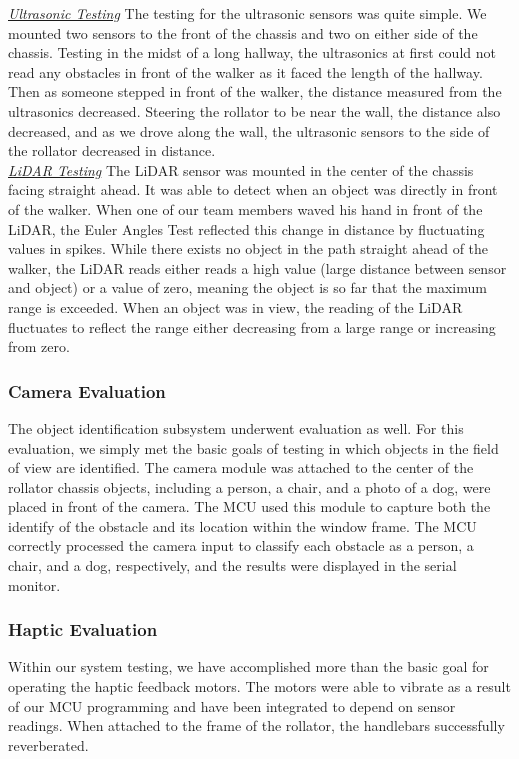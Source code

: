 \noindent \underline{\textit{Ultrasonic Testing}}
\noindent The testing for the ultrasonic sensors was quite simple. We mounted two sensors to the front of the chassis and two on either side of the chassis. Testing in the midst of a long hallway, the ultrasonics at first could not read any obstacles in front of the walker as it faced the length of the hallway. Then as someone stepped in front of the walker, the distance measured from the ultrasonics decreased. Steering the rollator to be near the wall, the distance also decreased, and as we drove along the wall, the ultrasonic sensors to the side of the rollator decreased in distance.\\

\noindent \underline{\textit{LiDAR Testing}} \noindent The LiDAR sensor was mounted in the center of the chassis facing straight ahead. It was able to detect when an object was directly in front of the walker. When one of our team members waved his hand in front of the LiDAR, the Euler Angles Test reflected this change in distance by fluctuating values in spikes. While there exists no object in the path straight ahead of the walker, the LiDAR reads either reads a high value (large distance between sensor and object) or a value of zero, meaning the object is so far that the maximum range is exceeded. When an object was in view, the reading of the LiDAR fluctuates to reflect the range either decreasing from a large range or increasing from zero.\\

\subsubsection{Camera Evaluation}
\noindent The object identification subsystem underwent evaluation as well. For this evaluation, we simply met the basic goals of testing in which objects in the field of view are identified. The camera module was attached to the center of the rollator chassis objects, including a person, a chair, and a photo of a dog, were placed in front of the camera. The MCU used this module to capture both the identify of the obstacle and its location within the window frame. The MCU correctly processed the camera input to classify each obstacle as a person, a chair, and a dog, respectively, and the results were displayed in the serial monitor.\\

\subsubsection{Haptic Evaluation}
\noindent Within our system testing, we have accomplished more than the basic goal for operating the haptic feedback motors. The motors were able to vibrate as a result of our MCU programming and have been integrated to depend on sensor readings. When attached to the frame of the rollator, the handlebars successfully reverberated.\\

